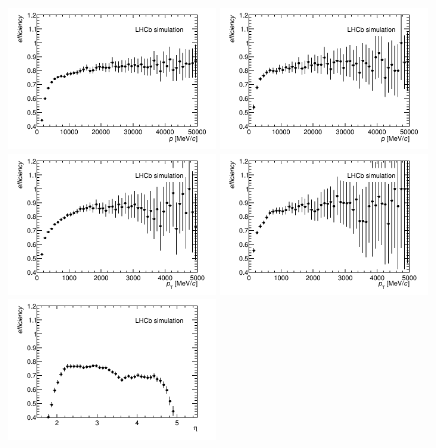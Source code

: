 \begin{figure}[tbph]
\begin{center}
\includegraphics[width = 0.49\textwidth]{figures/EffPatLLT/overall/DstD0piP.png} 
\includegraphics[width = 0.49\textwidth]{figures/EffPatLLT/overall/DstD0piFromBDP.png}
\includegraphics[width = 0.49\textwidth]{figures/EffPatLLT/overall/DstD0piPt.png} 
\includegraphics[width = 0.49\textwidth]{figures/EffPatLLT/overall/DstD0piFromBDPt.png}
\includegraphics[width = 0.49\textwidth]{figures/EffPatLLT/overall/DstD0piEta.png} 

\end{center}
\end{figure}
